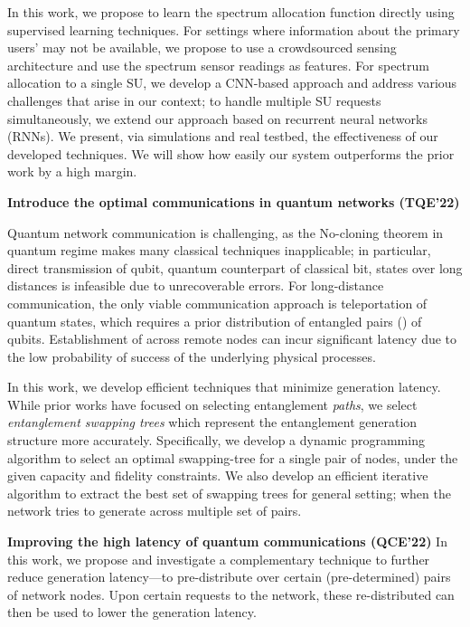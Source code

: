 In this work, we propose to learn the spectrum allocation function directly using supervised learning techniques. 
For settings where information about the primary users' may not be available, we propose to use a crowdsourced sensing architecture and use the spectrum sensor readings as features. 
For spectrum allocation to a single SU, we develop a CNN-based approach
and address various challenges that arise in our context; to handle multiple SU
requests simultaneously, we extend our approach based on recurrent neural networks (RNNs).
We present, via simulations and real testbed, the effectiveness of our developed techniques. We will show how easily our system outperforms the prior work by a high margin.


\vspace{6pt}\noindent \textbf{Introduce the optimal communications in quantum networks (TQE'22)}

Quantum network communication is challenging, as the No-cloning theorem in quantum regime makes many classical techniques inapplicable; in particular, 
direct transmission of qubit, quantum counterpart of classical bit, states over long distances is infeasible
due to unrecoverable errors.
For long-distance communication, the only viable communication approach is teleportation of quantum states, which requires a prior distribution of entangled pairs (\epss) of qubits.
Establishment of \epss across remote nodes can incur significant latency due to the low probability of success of the underlying physical processes. 

In this work, we develop efficient techniques that minimize \eps generation latency. While prior works
have focused on selecting entanglement \textit{paths}, we select \emph{entanglement swapping trees} which represent the entanglement generation structure more accurately.
Specifically, we develop a dynamic programming algorithm to select an optimal swapping-tree for a single pair of nodes, under the given capacity and fidelity constraints.
We also develop an efficient iterative algorithm to extract the best set of swapping trees for general setting; when the network tries to generate \epss across multiple set of pairs.



\vspace{6pt}\noindent \textbf{Improving the high latency of quantum communications (QCE'22)}
In this work, we propose and investigate a complementary technique to further reduce \eps generation latency---to pre-distribute \epss over certain (pre-determined) pairs of network nodes. 
Upon certain requests to the network, these re-distributed \epss can then be used to lower the generation latency.

